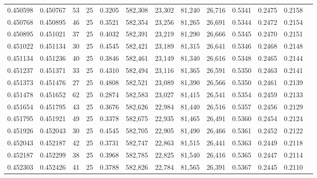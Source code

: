 \begin{tabular}{rrrrrrrrrrrrr}
0.450598 & 0.450767 &    53 &  25 &                                     0.3205 & 582,308 &  23,302 &  81,240 &  26,716 & 0.5341 & 0.2475 & 0.2158 \\
0.450768 & 0.450895 &    46 &  25 &                                     0.3521 & 582,354 &  23,256 &  81,265 &  26,691 & 0.5344 & 0.2472 & 0.2154 \\
0.450895 & 0.451021 &    37 &  25 &                                     0.4032 & 582,391 &  23,219 &  81,290 &  26,666 & 0.5345 & 0.2470 & 0.2151 \\
0.451022 & 0.451134 &    30 &  25 &                                     0.4545 & 582,421 &  23,189 &  81,315 &  26,641 & 0.5346 & 0.2468 & 0.2148 \\
0.451134 & 0.451236 &    40 &  25 &                                     0.3846 & 582,461 &  23,149 &  81,340 &  26,616 & 0.5348 & 0.2465 & 0.2144 \\
0.451237 & 0.451371 &    33 &  25 &                                     0.4310 & 582,494 &  23,116 &  81,365 &  26,591 & 0.5350 & 0.2463 & 0.2141 \\
0.451373 & 0.451476 &    27 &  25 &                                     0.4808 & 582,521 &  23,089 &  81,390 &  26,566 & 0.5350 & 0.2461 & 0.2139 \\
0.451478 & 0.451652 &    62 &  25 &                                     0.2874 & 582,583 &  23,027 &  81,415 &  26,541 & 0.5354 & 0.2459 & 0.2133 \\
0.451654 & 0.451795 &    43 &  25 &                                     0.3676 & 582,626 &  22,984 &  81,440 &  26,516 & 0.5357 & 0.2456 & 0.2129 \\
0.451795 & 0.451921 &    49 &  25 &                                     0.3378 & 582,675 &  22,935 &  81,465 &  26,491 & 0.5360 & 0.2454 & 0.2124 \\
0.451926 & 0.452043 &    30 &  25 &                                     0.4545 & 582,705 &  22,905 &  81,490 &  26,466 & 0.5361 & 0.2452 & 0.2122 \\
0.452043 & 0.452187 &    42 &  25 &                                     0.3731 & 582,747 &  22,863 &  81,515 &  26,441 & 0.5363 & 0.2449 & 0.2118 \\
0.452187 & 0.452299 &    38 &  25 &                                     0.3968 & 582,785 &  22,825 &  81,540 &  26,416 & 0.5365 & 0.2447 & 0.2114 \\
0.452303 & 0.452426 &    41 &  25 &                                     0.3788 & 582,826 &  22,784 &  81,565 &  26,391 & 0.5367 & 0.2445 & 0.2110 \\

\end{tabular}
